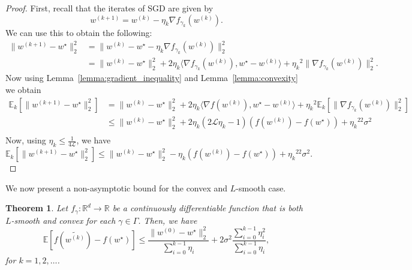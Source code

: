 \documentclass[12pt]{article}
\newtheorem{theorem}{Theorem}[section]
\theoremstyle{definition}
\numberwithin{equation}{section}
\newcommand{\R}{\mathbb{R}}
\newcommand{\E}{\mathbb{E}}
\newcommand{\CL}{\mathcal{L}}
\newcommand{\ev}[1]{\mathbb{E}\left[{#1}\right]}
\newcommand{\norm}[1]{\lVert{#1}\rVert_2}
\begin{document}
\begin{proof}
  First, recall that the iterates of SGD are given by
  \begin{equation*}
    w^{(k+1)} = w^{(k)} - \eta_k \nabla f_{\gamma_k}(w^{(k)}).
  \end{equation*}
  We can use this to obtain the following:
  \begin{align*}
    \norm{w^{(k+1)} - w^\star}^2 &= \norm{w^{(k)} - w^\star - \eta_k \nabla f_{\gamma_k}(w^{(k)})}^2 \\
    &= \norm{w^{(k)} - w^\star}^2 + 2 \eta_k \langle \nabla f_{\gamma_k}(w^{(k)}), w^\star - w^{(k)}\rangle + {\eta_k}^2\norm{\nabla f_{\gamma_k}(w^{(k)})}^2.
  \end{align*}
  Now using Lemma~\ref{lemma:gradient_inequality} and Lemma~\ref{lemma:convexity} we obtain
  \begin{align*}
    \E_k[\norm{w^{(k+1)} - w^\star}^2] &= \norm{w^{(k)} - w^\star}^2 + 2 \eta_k \langle \nabla f(w^{(k)}), w^\star - w^{(k)}\rangle + {\eta_k}^2\E_k[\norm{\nabla f_{\gamma_k}(w^{(k)})}^2] \\
    &\leq \norm{w^{(k)} - w^\star}^2 + 2 \eta_k(2\CL \eta_k - 1)(f(w^{(k)}) - f(w^\star))+ {\eta_k}^22\sigma^2 \\
  \end{align*}
  Now, using $\eta_k \leq \frac{1}{4 \CL}$, we have
  \begin{equation*}
    \E_k[\norm{w^{(k+1)} - w^\star}^2] \leq \norm{w^{(k)} - w^\star}^2 - \eta_k(f(w^{(k)}) - f(w^\star))+ {\eta_k}^22\sigma^2.
  \end{equation*}
\end{proof}
We now present a non-asymptotic bound for the convex and $L$-smooth case.
\begin{theorem}
  \label{thm:SGD_bound}
  Let $f_{\gamma} : \R^d \rightarrow \R$ be a continuously differentiable function that is both $L$-smooth and convex for each $\gamma \in \Gamma$. Then, we have
  \begin{equation*}
    \ev{f(\widetilde{w^{(k)}}) - f(w^\star)} \leq \frac{\norm{w^{(0)} - w^\star}^2}{\sum_{i=0}^{k-1}\eta_i} + 2 \sigma^2 \frac{\sum_{i=0}^{k-1}\eta_i^2}{\sum_{i=0}^{k-1}\eta_i},
  \end{equation*}
  for $k = 1, 2, \dots$.
\end{theorem}
\end{document}
